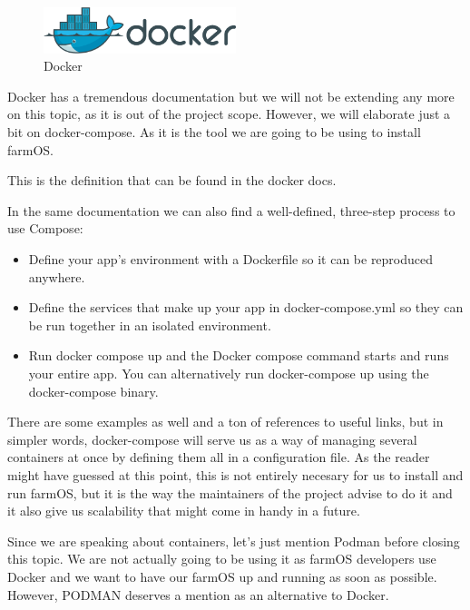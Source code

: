 \begin{figure}[H]
    \centering
    \includegraphics[width=0.5\textwidth]{fig/docker_logo.png}
        \caption{Docker}
    \label{fig:docker-logo}
\end{figure}

Docker has a tremendous documentation but we will not be extending any more on this topic, as it is out of the project scope. However, we will elaborate just a bit on docker-compose. As it is the tool we are going to be using to install farmOS.

This is the definition that can be found in the docker docs.


In the same documentation we can also find a well-defined, three-step process to use Compose:
\begin{itemize}
	\item Define your app’s environment with a Dockerfile so it can be reproduced anywhere.
	\item Define the services that make up your app in docker-compose.yml so they can be run together in an isolated environment.
	\item Run docker compose up and the Docker compose command starts and runs your entire app. You can alternatively run docker-compose up using the docker-compose binary.
\end{itemize}

There are some examples as well and a ton of references to useful links, but in simpler words, docker-compose will serve us as a way of managing several containers at once by defining them all in a configuration file. As the reader might have guessed at this point, this is not entirely necesary for us to install and run farmOS, but it is the way the maintainers of the project advise to do it and it also give us scalability that might come in handy in a future.

Since we are speaking about containers, let's just mention Podman before closing this topic. We are not actually going to be using it as farmOS developers use Docker and we want to have our farmOS up and running as soon as possible. However, PODMAN deserves a mention as an alternative to Docker.

